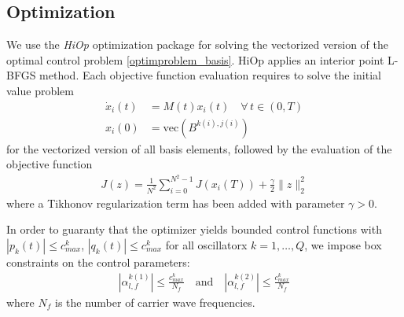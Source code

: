 \documentclass[letterpaper]{article}
\begin{document}
  \subsection{Optimization}
    We use the \textit{HiOp} optimization package for solving the vectorized version of the optimal control problem \eqref{optimproblem_basis}. HiOp applies an interior point L-BFGS method. Each objective function evaluation requires to solve the initial value problem  
    \begin{align*}
      \dot x_i(t) &= M(t) x_i(t) \quad \forall \, t\in (0,T) \\
      x_i(0) &= \mbox{vec}(B^{k(i),j(i)})
    \end{align*}
    for the vectorized version of all basis elements, followed by the evaluation of the objective function 
    \begin{align}
      J(z) = \frac{1}{N^2} \sum_{i=0}^{N^2-1} J(x_i(T)) + \frac{\gamma}{2} \| z\|^2_2
    \end{align}
    where a Tikhonov regularization term has been added with parameter $\gamma>0$.

    In order to guaranty that the optimizer yields bounded control functions with $|p_k(t)| \leq c^k_{max}$, $|q_k(t)| \leq c^k_{max}$ for all oscillatorx $k=1,\dots, Q$, we impose box constraints on the control parameters:
        \begin{align}
          | \alpha_{l,f}^{k(1)}| \leq \frac{c^k_{max}}{N_f} \quad \text{and} \quad | \alpha_{l,f}^{k(2)} | \leq \frac{c^k_{max}}{N_f}
        \end{align}
        where $N_f$ is the number of carrier wave frequencies.
\end{document}
